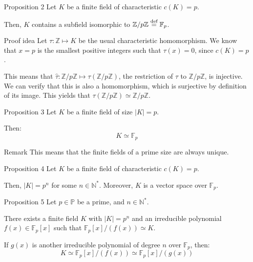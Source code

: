 \documentclass[a4paper]{article}
\begin{document}
\begin{parag}{Proposition 2}
    Let $K$ be a finite field of characteristic $c\left(K\right) = p$.

    Then, $K$ contains a subfield isomorphic to $\mathbb{Z}/p\mathbb{Z} \over{=}{def} \mathbb{F}_p$.

    \begin{subparag}{Proof idea}
        Let $\tau: \mathbb{Z} \mapsto K$ be the usual characteristic homomorphism. We know that $x = p$ is the smallest positive integers such that $\tau\left(x\right) = 0$, since $c\left(K\right) = p$.

        This means that $\hat{\tau}: \mathbb{Z}/p\mathbb{Z} \mapsto \tau\left(\mathbb{Z}/p\mathbb{Z}\right)$, the restriction of $\tau$ to $\mathbb{Z}/p\mathbb{Z}$, is injective. We can verify that this is also a homomorphism, which is surjective by definition of its image. This yields that $\tau\left(\mathbb{Z}/p\mathbb{Z}\right) \simeq \mathbb{Z}/p\mathbb{Z}$.
    \end{subparag}
\end{parag}

\begin{parag}{Proposition 3}
    Let $K$ be a finite field of size $\left|K\right| = p$.

    Then: 
    \[K \simeq \mathbb{F}_p\]

    \begin{subparag}{Remark}
        This means that the finite fields of a prime size are always unique.
    \end{subparag}
\end{parag}

\begin{parag}{Proposition 4}
    Let $K$ be a finite field of characteristic $c\left(K\right) = p$.

    Then, $\left|K\right| = p^n$ for some $n \in \mathbb{N}^*$. Moreover, $K$ is a vector space over $\mathbb{F}_p$.
\end{parag}

\begin{parag}{Proposition 5}
    Let $p \in \mathbb{P}$ be a prime, and $n \in \mathbb{N}^*$.

    There exists a finite field $K$ with $\left|K\right| = p^n$ and an irreducible polynomial $f\left(x\right) \in \mathbb{F}_p\left[x\right]$ such that $\mathbb{F}_p\left[x\right] / \left(f\left(x\right)\right) \simeq K$.

    If $g\left(x\right)$ is another irreducible polynomial of degree $n$ over $\mathbb{F}_p$, then: 
    \[K \simeq \mathbb{F}_p\left[x\right] / \left(f\left(x\right)\right) \simeq \mathbb{F}_p\left[x\right] / \left(g\left(x\right)\right)\]
\end{parag}
\end{document}
